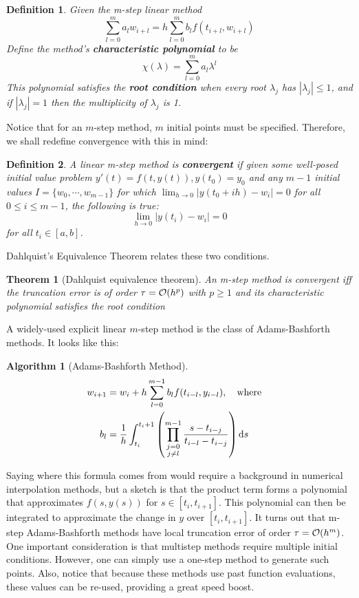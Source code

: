 \documentclass{article}
\newtheorem{definition}{Definition}[section]
\newtheorem{theorem}{Theorem}[section]
\newtheorem{algorithm}{Algorithm}[section]
\newcommand{\0}{\vb{0}}
\begin{document}
\begin{definition}
  Given the m-step linear method
  \[\sum_{l=0}^ma_lw_{i+l} = h\sum_{l=0}^mb_lf(t_{i+l}, w_{i+l})\]
  Define the method's \textbf{characteristic polynomial} to be
  \[\chi(\lambda) = \sum_{l=0}^ma_l\lambda^l\]
  This polynomial satisfies the \textbf{root condition} when every root $\lambda_j$ has $|\lambda_j| \leq 1$, and if $|\lambda_j| = 1$ then the multiplicity of $\lambda_j$ is 1.
\end{definition}
Notice that for an $m$-step method, $m$ initial points must be specified. Therefore, we shall redefine convergence with this in mind:
\begin{definition}
  A linear m-step method is \textbf{convergent} if given some well-posed initial value problem $y'(t) = f(t, y(t)), y(t_0) = y_0$ and any $m-1$ initial values $I = \{w_0, \cdots, w_{m-1}\}$ for which $\lim_{h\to0}|y(t_0 + ih) - w_i| = 0$ for all $0 \leq i\leq m-1$, the following is true:
  \[\lim_{h\to0}|y(t_i) - w_i| = 0\]
  for all $t_i \in [a, b]$.
\end{definition}

Dahlquist's Equivalence Theorem \citep{dahlquist1956} relates these two conditions.

\begin{theorem}[Dahlquist equivalence theorem]
  An m-step method is convergent iff the truncation error is of order $\tau = \order{h^p}$ with $p \geq 1$ and its characteristic polynomial satisfies the root condition
\end{theorem}

A widely-used explicit linear $m$-step method is the class of Adams-Bashforth methods. It looks like this:
\begin{algorithm}[Adams-Bashforth Method]
  \begin{align*}
    w_{i+1} & = w_i + h\sum_{l=0}^{m-1}b_lf(t_{i-l}, y_{i-l}), \qq{where} \\
    b_l & = \frac{1}{h}\int_{t_i}^{t_i+1}\qty(\prod_{\substack{j=0\\j\neq l}}^{m-1}\frac{s-t_{i-j}}{t_{i-l} - t_{i-j}})\dd{s}
  \end{align*}
\end{algorithm}
Saying where this formula comes from would require a background in numerical interpolation methods, but a sketch is that the product term forms a polynomial that approximates $f(s, y(s))$ for $s \in [t_i, t_{i+1}]$. This polynomial can then be integrated to approximate the change in $y$ over $[t_{i}, t_{i+1}]$. It turns out that m-step Adams-Bashforth methods have local truncation error of order $\tau = \order{h^m}$. One important consideration is that multistep methods require multiple initial conditions. However, one can simply use a one-step method to generate such points. Also, notice that because these methods use past function evaluations, these values can be re-used, providing a great speed boost.
\end{document}
